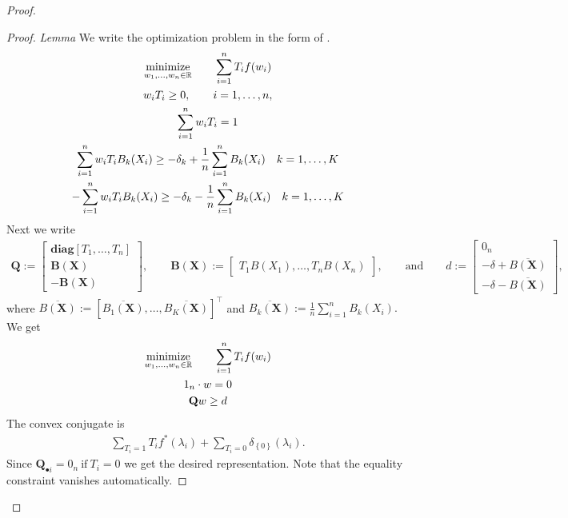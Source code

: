 \begin{proof}
\begin{lemma}
  \end{lemma}
  \begin{proof}
    \emph{Lemma}
    We write the optimization problem in the form of \cite{Tseng1991}.
    \begin{gather}
    \underset{w_1, \ldots, w_n \in \mathbb{R}}{\mathrm{minimize}}
    \qquad
    \sum_{i = 1}^{n} T_i f(w_i)
    \\
    w_i T_i \ge 0,
    \qquad 
    i = 1, \ldots, n,
    \\
  \sum_{ i = 1 }^{n}
    w_i T_i
  =
  1
    \\  
      \sum_{i = 1}^{n} w_i T_i B_k(X_i)
      \ge
      -\delta_k
      + 
      \frac{1}{n} \sum_{i = 1}^{n} B_k(X_i)
      \quad
      k=1,\ldots,K
    \\  
    -  \sum_{i = 1}^{n} w_i T_i B_k(X_i)
      \ge
      -\delta_k
      - 
      \frac{1}{n} \sum_{i = 1}^{n} B_k(X_i)
      \quad
      k=1,\ldots,K
    \end{gather}
    Next we write
 \begin{gather}
    \mathbf{Q}
    :=
    \begin{bmatrix}
      \mathbf{diag}[T_1,\ldots,T_n]\\
      \mathbf{B}(\mathbf{X})\\
      -\mathbf{B}(\mathbf{X})
    \end{bmatrix}
    ,
    \qquad
    \mathbf{B}(\mathbf{X})
    :=
    \begin{bmatrix}
      T_1B(X_1), \ldots, T_nB(X_n)
    \end{bmatrix}
    ,
    \qquad
    \text{and}
    \qquad
    d
    :=
    \begin{bmatrix}
      0_n\\
      -\delta 
      + \overline{B(\mathbf{X})}
      \\
      -\delta
      - \overline{B(\mathbf{X})}
    \end{bmatrix}
    ,
  \end{gather}
  where
  $
       \overline{B(\mathbf{X})}
       :=
       [
       \overline{B_1(\mathbf{X})}
       ,
       \ldots
       ,
       \overline{B_K(\mathbf{X})}
       ]
       ^\top
  $
and
$
       \overline{B_k(\mathbf{X})}
       :=
      \frac{1}{n} \sum_{i = 1}^{n} B_k(X_i)
      .
$
We get
\begin{gather}
    \underset{w_1, \ldots, w_n \in \mathbb{R}}{\mathrm{minimize}}
    \qquad
    \sum_{i = 1}^{n} T_i f(w_i)
    \\
    \mathrm{1}_n \cdot w
    =0
    \\
    \mathbf{Q}w \ge d
\end{gather}
The convex conjugate is
\begin{gather}
  \sum_{T_i=1} T_i f^*(\lambda_i)
  +
  \sum_{T_i=0} 
  \delta_{\left\{ 0 \right\}}(\lambda_i)
  .
\end{gather}
Since
$
\mathbf{Q}_{\bullet i}=\mathrm{0}_n
\ 
\text{if}
\ 
T_i=0
$
we get the desired representation. Note that the equality constraint vanishes automatically.
  \end{proof}

\end{proof}
